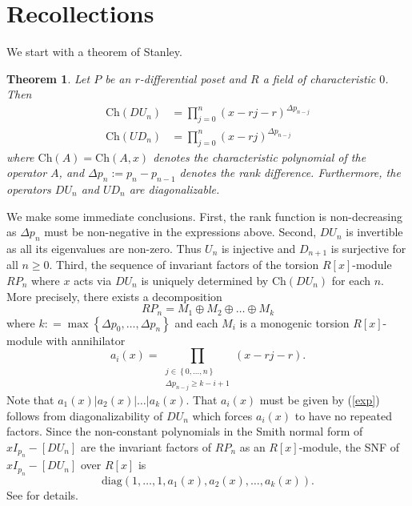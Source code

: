\documentclass[11pt]{article}
\newtheorem{theorem}[theo]{Theorem}
\theoremstyle{definition}
\numberwithin{equation}{section}
\newcommand{\diag}{\mathrm{diag}}
\newcommand{\Ch}{\mathrm{Ch}}
\begin{document}
\section{Recollections}   
\label{recoll}    

We start with a theorem of Stanley. 
\begin{theorem} \cite[\S 4]{Stanley88}    \label{Stanley}         Let $P$ be  an  $r$-differential poset and $ R $ a field of characteristic $ 0 $. Then
\[
\begin{aligned}
\Ch(DU_{n}) &=\prod_{j=0}^n (x - r j - r  )^{\Delta p_{n-j}} \\
\Ch(UD_n) &=\prod_{j=0}^n (x - r j  )^{\Delta p_{n-j}}
\end{aligned}
\]
where $ \Ch(A) = \Ch(A,x) $ denotes the characteristic polynomial of the operator $ A$, and $ \Delta p_n:=p_n - p_{n-1} $ denotes the rank difference.  Furthermore, the operators $ DU_{n} $ and $ UD_{n} $ are diagonalizable.                                                                                   
\end{theorem}


We make some immediate conclusions. First, the rank function is non-decreasing as $ \Delta   p_{n} $ must be non-negative in the expressions above. Second, $ DU_{n} $ is invertible as all its eigenvalues are non-zero.  Thus $ U_{n} $ is injective and $ D_{n+1} $ is surjective for all $ n \geq 0 $.   Third, the  sequence of  invariant factors of the torsion  $ R[x] $-module $ RP_{n} $ where $ x $ acts via $ DU_{n} $ is uniquely determined by $  \Ch (DU_{n}) $ for each $n$.  More precisely, there exists a decomposition  $$ RP_{n} =  M_{1} \oplus M_{2} \oplus  \ldots \oplus  M_{k} $$ where $  k  : =  \max           \left \{    \Delta p_{0}, \ldots, \Delta p_{n} \right \}   $  and each $ M_{i} $ is a monogenic  torsion $R[x] $-module with annihilator  \begin{equation} 
\label{exp}  a_{i}(x)  =   \prod _{       \substack{ j \in \left  \{  0 , \ldots, n \right \}    \\ \Delta p_{n-j}  \geq k - i   +  1 }  }  ( x - rj- r)      .     
\end{equation}  Note that $  a_{1} (x) | a_{2}(x) | \ldots  |  a_{k  } ( x)    $. That $ a_{i}(x) $ must be given by (\ref{exp})     follows from diagonalizability of $ DU_{n} $ which forces $ a_{i}(x) $ to have no repeated  factors.   Since the non-constant polynomials in the Smith normal form of  $ xI_{p_{n}} -   [DU_{n}]  %
$  are the invariant factors of $ R P_{n}   $ as an $R[x]$-module, the SNF of $ xI_{p_{n}} - [DU_{n}]    $     over $ R[x] $ is  $$ \diag( 1, \ldots, 1, a_{1}(x) , a_{2}(x), \ldots, a_{k}(x) ) . $$          
%
See \cite[\S 8.2]{Miller} for  details.    
\end{document}
